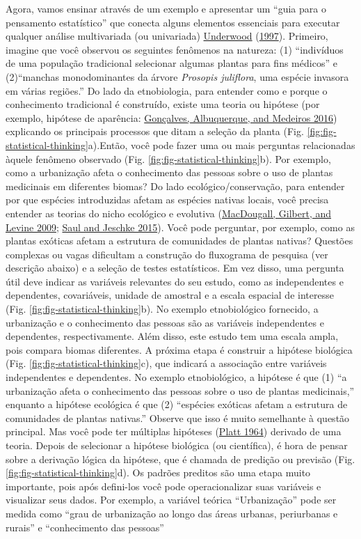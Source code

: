 \documentclass[
]{article}
\begin{document}
Agora, vamos ensinar através de um exemplo e apresentar um ``guia para o pensamento estatístico'' que conecta alguns elementos essenciais para executar qualquer análise multivariada (ou univariada) \protect\hyperlink{ref-underwood_experiments_1997}{Underwood} (\protect\hyperlink{ref-underwood_experiments_1997}{1997}). Primeiro, imagine que você observou os seguintes fenômenos na natureza: (1) ``indivíduos de uma população tradicional selecionar algumas plantas para fins médicos'' e (2)``manchas monodominantes da árvore \emph{Prosopis juliflora}, uma espécie invasora em várias regiões.'' Do lado da etnobiologia, para entender como e porque o conhecimento tradicional é construído, existe uma teoria ou hipótese (por exemplo, hipótese de aparência: \protect\hyperlink{ref-goncalves_most_2016}{Gonçalves, Albuquerque, and Medeiros 2016}) explicando os principais processos que ditam a seleção da planta (Fig. \ref{fig:fig-statistical-thinking}a).Então, você pode fazer uma ou mais perguntas relacionadas àquele fenômeno observado (Fig. \ref{fig:fig-statistical-thinking}b). Por exemplo, como a urbanização afeta o conhecimento das pessoas sobre o uso de plantas medicinais em diferentes biomas? Do lado ecológico/conservação, para entender por que espécies introduzidas afetam as espécies nativas locais, você precisa entender as teorias do nicho ecológico e evolutiva (\protect\hyperlink{ref-macdougall_plant_2009}{MacDougall, Gilbert, and Levine 2009}; \protect\hyperlink{ref-saul_eco-evolutionary_2015}{Saul and Jeschke 2015}). Você pode perguntar, por exemplo, como as plantas exóticas afetam a estrutura de comunidades de plantas nativas? Questões complexas ou vagas dificultam a construção do fluxograma de pesquisa (ver descrição abaixo) e a seleção de testes estatísticos. Em vez disso, uma pergunta útil deve indicar as variáveis relevantes do seu estudo, como as independentes e dependentes, covariáveis, unidade de amostral e a escala espacial de interesse (Fig. \ref{fig:fig-statistical-thinking}b). No exemplo etnobiológico fornecido, a urbanização e o conhecimento das pessoas são as variáveis independentes e dependentes, respectivamente. Além disso, este estudo tem uma escala ampla, pois compara biomas diferentes. A próxima etapa é construir a hipótese biológica (Fig. \ref{fig:fig-statistical-thinking}c), que indicará a associação entre variáveis independentes e dependentes. No exemplo etnobiológico, a hipótese é que (1) ``a urbanização afeta o conhecimento das pessoas sobre o uso de plantas medicinais,'' enquanto a hipótese ecológica é que (2) ``espécies exóticas afetam a estrutura de comunidades de plantas nativas.'' Observe que isso é muito semelhante à questão principal. Mas você pode ter múltiplas hipóteses (\protect\hyperlink{ref-platt_strong_1964}{Platt 1964}) derivado de uma teoria. Depois de selecionar a hipótese biológica (ou científica), é hora de pensar sobre a derivação lógica da hipótese, que é chamada de predição ou previsão (Fig. \ref{fig:fig-statistical-thinking}d). Os padrões preditos são uma etapa muito importante, pois após defini-los você pode operacionalizar suas variáveis e visualizar seus dados. Por exemplo, a variável teórica ``Urbanização'' pode ser medida como ``grau de urbanização ao longo das áreas urbanas, periurbanas e rurais'' e ``conhecimento das pessoas'' 
\end{document}
